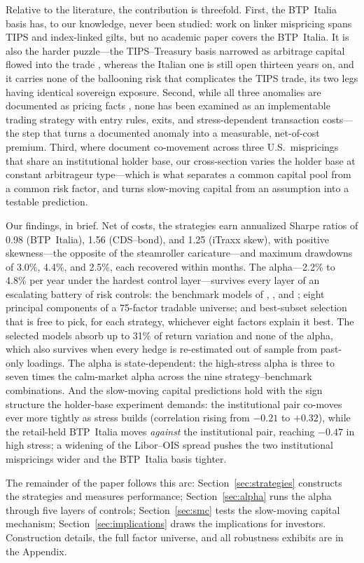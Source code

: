 Relative to the literature, the contribution is threefold. First, the
BTP~Italia basis has, to our knowledge, never been studied: work on linker
mispricing spans TIPS and index-linked gilts, but no academic paper covers the
BTP~Italia. It is also the harder puzzle---the TIPS--Treasury basis narrowed
as arbitrage capital flowed into the trade \citep{fleckenstein2014tips},
whereas the Italian one is still open thirteen years on, and it carries none
of the ballooning risk that complicates the TIPS trade, its two legs having
identical sovereign exposure. Second, while all three anomalies are documented
as pricing facts \citep{hull2004relationship, longstaff2005corporate,
junge2015liquidity}, none has been examined as an implementable trading
strategy with entry rules, exits, and stress-dependent transaction costs---the
step that turns a documented anomaly into a measurable, net-of-cost premium.
Third, where \citet{fleckenstein2014tips} document co-movement across three
U.S.\ mispricings that share an institutional holder base, our cross-section
varies the holder base at constant arbitrageur type---which is what separates
a common capital pool from a common risk factor, and turns slow-moving
capital from an assumption into a testable prediction.

Our findings, in brief. Net of costs, the strategies earn annualized Sharpe
ratios of 0.98 (BTP~Italia), 1.56 (CDS--bond), and 1.25 (iTraxx skew), with
positive skewness---the opposite of the steamroller caricature---and maximum
drawdowns of 3.0\%, 4.4\%, and 2.5\%, each recovered within months. The alpha---2.2\% to 4.8\% per year under the hardest control
layer---survives every layer of an escalating battery of risk
controls: the benchmark models of \citet{duarte2007risk},
\citet{fung2004hedge}, and \citet{brooks2020active}; eight principal
components of a 75-factor tradable universe; and best-subset selection that is
free to pick, for each strategy, whichever eight factors explain it best. The
selected models absorb up to 31\% of return variation and none of the alpha,
which also survives when every hedge is re-estimated out of sample from
past-only loadings. The alpha is state-dependent: the high-stress alpha is
three to seven times the calm-market alpha across the nine strategy--benchmark
combinations. And the slow-moving capital predictions hold with the sign
structure the holder-base experiment demands: the institutional pair co-moves
ever more tightly as stress builds (correlation rising from $-0.21$ to
$+0.32$), while the retail-held BTP~Italia moves \emph{against} the
institutional pair, reaching $-0.47$ in high stress; a widening of the
Libor--OIS spread pushes the two institutional mispricings wider and the
BTP~Italia basis tighter.

The remainder of the paper follows this arc: Section~\ref{sec:strategies}
constructs the strategies and measures performance;
Section~\ref{sec:alpha} runs the alpha through five layers of controls;
Section~\ref{sec:smc} tests the slow-moving capital mechanism;
Section~\ref{sec:implications} draws the implications for investors.
Construction details, the full factor universe, and all robustness exhibits
are in the Appendix.
